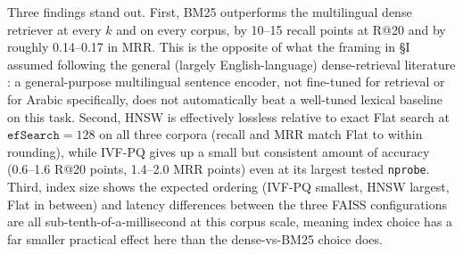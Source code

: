 \documentclass[conference]{IEEEtran}
\begin{document}
Three findings stand out. First, BM25 outperforms the multilingual dense retriever at every $k$ and on every corpus, by 10--15 recall points at R@20 and by roughly 0.14--0.17 in MRR. This is the opposite of what the framing in \S I assumed following the general (largely English-language) dense-retrieval literature \cite{karpukhin2020dense}: a general-purpose multilingual sentence encoder, not fine-tuned for retrieval or for Arabic specifically, does not automatically beat a well-tuned lexical baseline on this task. Second, HNSW is effectively lossless relative to exact Flat search at $\texttt{efSearch}=128$ on all three corpora (recall and MRR match Flat to within rounding), while IVF-PQ gives up a small but consistent amount of accuracy (0.6--1.6 R@20 points, 1.4--2.0 MRR points) even at its largest tested \texttt{nprobe}. Third, index size shows the expected ordering (IVF-PQ smallest, HNSW largest, Flat in between) and latency differences between the three FAISS configurations are all sub-tenth-of-a-millisecond at this corpus scale, meaning index choice has a far smaller practical effect here than the dense-vs-BM25 choice does.

\begin{table}[h]
\centering
\caption{ARCD accuracy-latency sweep. IVF-PQ over \texttt{nprobe} (nlist=32); HNSW over \texttt{efSearch} (M=32).}
\label{tab:sweep}
\end{table}
\end{document}
